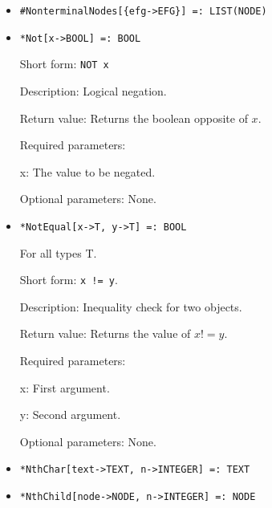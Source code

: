 \begin{itemize}
\item
\protect \large \begin{verbatim} 
#NonterminalNodes[{efg->EFG}] =: LIST(NODE)
\end{verbatim}\normalsize

\item
\protect \large \begin{verbatim}
*Not[x->BOOL] =: BOOL
\end{verbatim}\normalsize

\bd
\item
[Short form:] \verb+NOT x+
\item
[Description:] Logical negation.
\item
[Return value:] Returns the boolean opposite of $x$.  
\item
[Required parameters:]\hfil\null
\bd
\item
[x:] The value to be negated.
\ed
\item
[Optional parameters:] None.
\ed

\item
\protect \large \begin{verbatim}
*NotEqual[x->T, y->T] =: BOOL
\end{verbatim}\normalsize

For all types T.

\bd
\item
[Short form:] \verb+x != y+.
\item
[Description:] Inequality check for two objects.
\item
[Return value:] Returns the value of $x != y$.
\item
[Required parameters:]\hfil\null
	
\bd
\item
[x:] First argument.
\item
[y:] Second argument.
\ed

\item
[Optional parameters:] None.

\ed

\item
\protect \large \begin{verbatim}
*NthChar[text->TEXT, n->INTEGER] =: TEXT
\end{verbatim}\normalsize

\item
\protect \large \begin{verbatim} 
*NthChild[node->NODE, n->INTEGER] =: NODE
\end{verbatim}\normalsize


\end{itemize}

